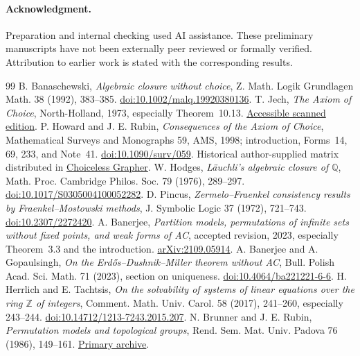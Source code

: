 \documentclass[11pt,a4paper]{article}
\theoremstyle{definition}\newtheorem{definition}[theorem]{Definition}
\theoremstyle{remark}\newtheorem{remark}[theorem]{Remark}
\newcommand{\Q}{\mathbb Q}\newcommand{\F}{\mathbb F}
\begin{document}
\paragraph{Acknowledgment.} Preparation and internal checking used AI assistance. These preliminary manuscripts have not been externally peer reviewed or formally verified. Attribution to earlier work is stated with the corresponding results.

\begin{thebibliography}{99}
 B. Banaschewski, \emph{Algebraic closure without choice}, Z. Math. Logik Grundlagen Math. 38 (1992), 383--385. \href{https://doi.org/10.1002/malq.19920380136}{doi:10.1002/malq.19920380136}.
 T. Jech, \emph{The Axiom of Choice}, North-Holland, 1973, especially Theorem~10.13. \href{https://gwern.net/doc/math/1973-jech-theaxiomofchoice.pdf}{Accessible scanned edition}.
 P. Howard and J. E. Rubin, \emph{Consequences of the Axiom of Choice}, Mathematical Surveys and Monographs 59, AMS, 1998; introduction, Forms~14, 69, 233, and Note~41. \href{https://doi.org/10.1090/surv/059}{doi:10.1090/surv/059}. Historical author-supplied matrix distributed in \href{https://github.com/ioannad/jeffrey}{Choiceless Grapher}.
 W. Hodges, \emph{L\"auchli's algebraic closure of $\Q$}, Math. Proc. Cambridge Philos. Soc. 79 (1976), 289--297. \href{https://doi.org/10.1017/S0305004100052282}{doi:10.1017/S0305004100052282}.
 D. Pincus, \emph{Zermelo--Fraenkel consistency results by Fraenkel--Mostowski methods}, J. Symbolic Logic 37 (1972), 721--743. \href{https://doi.org/10.2307/2272420}{doi:10.2307/2272420}.
 A. Banerjee, \emph{Partition models, permutations of infinite sets without fixed points, and weak forms of AC}, accepted revision, 2023, especially Theorem~3.3 and the introduction. \href{https://arxiv.org/abs/2109.05914}{arXiv:2109.05914}.
 A. Banerjee and A. Gopaulsingh, \emph{On the Erd\H{o}s--Dushnik--Miller theorem without AC}, Bull. Polish Acad. Sci. Math. 71 (2023), section on uniqueness. \href{https://doi.org/10.4064/ba221221-6-6}{doi:10.4064/ba221221-6-6}.
 H. Herrlich and E. Tachtsis, \emph{On the solvability of systems of linear equations over the ring $\mathbb Z$ of integers}, Comment. Math. Univ. Carol. 58 (2017), 241--260, especially 243--244. \href{https://doi.org/10.14712/1213-7243.2015.207}{doi:10.14712/1213-7243.2015.207}.
 N. Brunner and J. E. Rubin, \emph{Permutation models and topological groups}, Rend. Sem. Mat. Univ. Padova 76 (1986), 149--161. \href{https://www.numdam.org/item/RSMUP_1986__76__149_0/}{Primary archive}.

\end{thebibliography}
\end{document}
